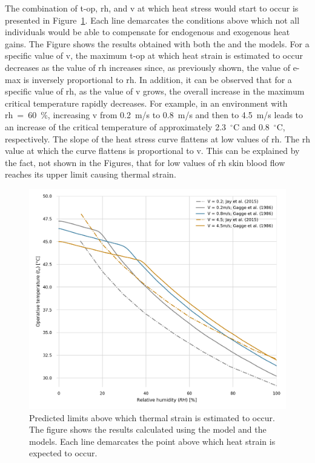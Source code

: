 The combination of \ac{t-op}, \ac{rh}, and \ac{v} at which heat stress would start to occur is presented in Figure~\ref{fig:comparison_air_speed}.
Each line demarcates the conditions above which not all individuals would be able to compensate for endogenous and exogenous heat gains.
The Figure shows the results obtained with both the  and the  models.
For a specific value of \ac{v}, the maximum \ac{t-op} at which heat strain is estimated to occur decreases as the value of \ac{rh} increases since, as previously shown, the value of \ac{e-max} is inversely proportional to \ac{rh}.
In addition, it can be observed that for a specific value of \ac{rh}, as the value of \ac{v} grows, the overall increase in the maximum critical temperature rapidly decreases.
For example, in an environment with \ac{rh}~=~60~\%, increasing \ac{v} from 0.2~m/s to 0.8~m/s and then to 4.5~m/s leads to an increase of the critical temperature of approximately 2.3~$^{\circ}$C and 0.8~$^{\circ}$C, respectively.
The slope of the heat stress curve flattens at low values of \ac{rh}.
The \ac{rh} value at which the curve flattens is proportional to \ac{v}.
This can be explained by the fact, not shown in the Figures, that for low values of \ac{rh} skin blood flow reaches its upper limit causing thermal strain.

\begin{figure}[thb!]
    \centering
    \includegraphics[width=\textwidth]{figures/comparison_air_speed}
    \caption{Predicted limits above which thermal strain is estimated to occur.
    The figure shows the results calculated using the  model and the  models.
    Each line demarcates the point above which heat strain is expected to occur.}
    \label{fig:comparison_air_speed}
\end{figure}

